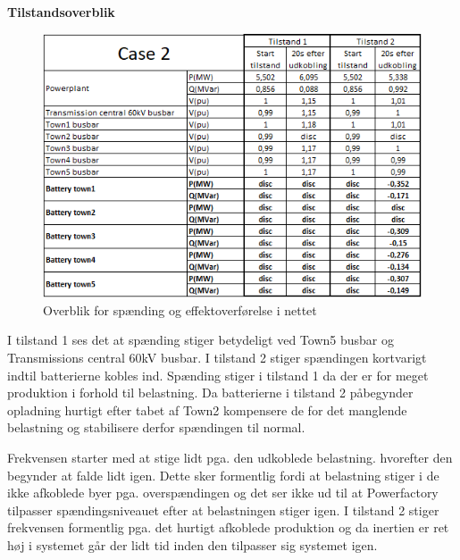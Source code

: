 \textbf{Tilstandsoverblik}
\begin{figure}[H] %
	\centering
	\includegraphics[width=1\textwidth]{figurer/LossOfTown/Overview}
	\caption{Overblik for spænding og effektoverførelse i nettet}
	\label{fig:C2Overview}
\end{figure}

I tilstand 1 ses det at spænding stiger betydeligt ved Town5 busbar og Transmissions central 60kV busbar. I tilstand 2 stiger spændingen kortvarigt indtil batterierne kobles ind. Spænding stiger i tilstand 1 da der er for meget produktion i forhold til belastning. Da batterierne i tilstand 2 påbegynder opladning hurtigt efter tabet af Town2 kompensere de for det manglende belastning og stabilisere derfor spændingen til normal.

Frekvensen starter med at stige lidt pga. den udkoblede belastning. hvorefter den begynder at falde lidt igen. Dette sker formentlig fordi at belastning stiger i de ikke afkoblede byer pga. overspændingen og det ser ikke ud til at Powerfactory tilpasser spændingsniveauet efter at belastningen stiger igen. I tilstand 2 stiger frekvensen formentlig pga. det hurtigt afkoblede produktion og da inertien er ret høj i systemet går der lidt tid inden den tilpasser sig systemet igen.
  
